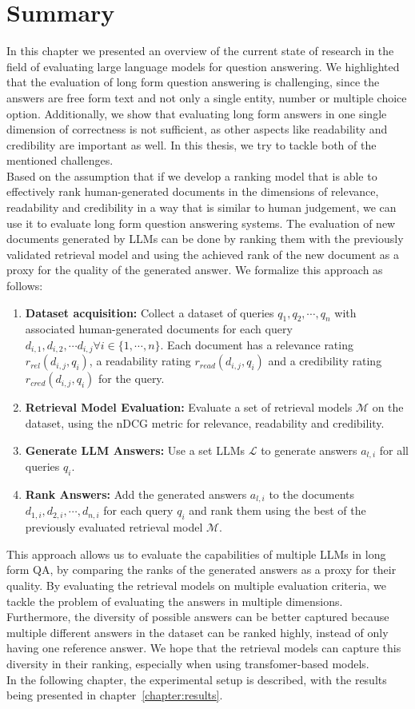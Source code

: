 \section{Summary}
In this chapter we presented an overview of the current state of research in the field of evaluating large language models for question answering.
We highlighted that the evaluation of long form question answering is challenging, since the answers are free form text and not only a single entity, number or multiple choice option.
Additionally, we show that evaluating long form answers in one single dimension of correctness is not sufficient, as other aspects like readability and credibility are important as well.
In this thesis, we try to tackle both of the mentioned challenges.
\\
Based on the assumption that if we develop a ranking model that is able to effectively rank human-generated documents in the dimensions of relevance, readability and credibility in a way that is similar to human judgement, we can use it to evaluate long form question answering systems.
The evaluation of new documents generated by LLMs can be done by ranking them with the previously validated retrieval model and using the achieved rank of the new document as a proxy for the quality of the generated answer.
We formalize this approach as follows:
\begin{enumerate}
    \item \textbf{Dataset acquisition:} Collect a dataset of queries \( q_1, q_2, \cdots, q_n \) with associated human-generated documents for each query \( d_{i,1}, d_{i,2}, \cdots d_{i,j} \forall i \in \{1, \cdots, n\} \). Each document has a relevance rating \( r_{rel}(d_{i,j}, q_i) \), a readability rating \( r_{read}(d_{i,j}, q_i) \) and a credibility rating \( r_{cred}(d_{i,j}, q_i) \) for the query.
    \item \textbf{Retrieval Model Evaluation:} Evaluate a set of retrieval models \( \mathcal{M}\) on the dataset, using the nDCG metric for relevance, readability and credibility.
    \item \textbf{Generate LLM Answers:} Use a set LLMs \( \mathcal{L} \) to generate answers \( a_{l,i} \) for all queries \( q_i \).
    \item \textbf{Rank Answers:} Add the generated answers \( a_{l,i} \) to the documents \(d_{1,i}, d_{2,i}, \cdots, d_{n,i} \) for each query \( q_i \) and rank them using the best of the previously evaluated retrieval model \( \mathcal{M} \).
\end{enumerate}
This approach allows us to evaluate the capabilities of multiple LLMs in long form QA, by comparing the ranks of the generated answers as a proxy for their quality.
By evaluating the retrieval models on multiple evaluation criteria, we tackle the problem of evaluating the answers in multiple dimensions.
Furthermore, the diversity of possible answers can be better captured because multiple different answers in the dataset can be ranked highly, instead of only having one reference answer.
We hope that the retrieval models can capture this diversity in their ranking, especially when using transfomer-based models.
\\
In the following chapter, the experimental setup is described, with the results being presented in chapter~\ref{chapter:results}.